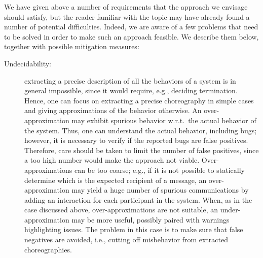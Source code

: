 We have given above a number of requirements that the approach we
envisage should satisfy, but the reader familiar with the topic may
have already found a number of potential difficulties. Indeed, we are
aware of a few problems that need to be solved in order to make such
an approach feasible. We describe them below, together with possible
mitigation measures:

\begin{description}
\item[Undecidability:]
	 extracting a precise description of all the behaviors of a system
	 is in general impossible, since it would require, e.g., deciding
	 termination.
	 Hence, one can focus on extracting a precise choreography in
    simple cases and giving approximations of the behavior
    otherwise.
	 An over-approximation may exhibit spurious behavior
	 w.r.t.\ the actual behavior of the system.
	 Thus, one can understand the actual behavior, including bugs;
	 however, it is necessary to verify if the reported bugs are false
	 positives.
	 Therefore, care should be taken to limit the number of
	 false positives, since a too high number would make the approach
	 not viable.
	 Over-approximations can be too coarse; e.g., if it is not
	 possible to statically determine which is the expected recipient of a
	 message, an over-approximation may yield a huge number of spurious
	 communications by adding an interaction for each participant in
	 the system.
	 When, as in the case discussed above, over-approximations are not
	 suitable, an under-approximation may be more useful, possibly
	 paired with warnings highlighting issues.
	 The problem in this case is to make sure that false negatives are
	 avoided, i.e., cutting off misbehavior from extracted
	 choreographies.

\end{description}
